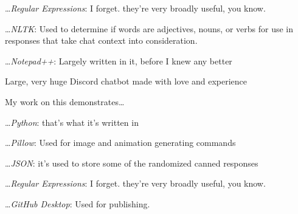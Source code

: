 \documentclass[10mm,letterpaper,notitlepage]{article}
\begin{document}
							\ldots\textit{Regular Expressions}: I forget. they're very broadly useful, you know.
							
							\ldots\textit{NLTK}: Used to determine if words are adjectives, nouns, or verbs for use in responses that take chat context into consideration.
							
							\ldots\textit{Notepad++}: Largely written in it, before I knew any better
							
						\setlength{\parindent}{\parindent-4mm}
							\fontsize{4.5mm}{6.0mm}\selectfont
							\color[RGB]{153, 141, 163}
						\color[RGB]{153, 141, 163}{R}\color[RGB]{153, 141, 163}{S}\color[RGB]{153, 141, 163}{R}\color[RGB]{153, 141, 163}{B}\color[RGB]{153, 141, 163}{ }\color[RGB]{153, 141, 163}{R}\color[RGB]{153, 141, 163}{e}\color[RGB]{153, 141, 163}{w}\color[RGB]{153, 141, 163}{r}\color[RGB]{153, 141, 163}{i}\color[RGB]{153, 141, 163}{t}\color[RGB]{153, 141, 163}{e}
						\fontsize{2.6999999999999997mm}{3.5999999999999996mm}\selectfont
						\color[RGB]{0, 0, 0}
					Large, very huge Discord chatbot made with love and experience
					
					My work on this demonstrates\ldots
						\setlength{\parindent}{\parindent+4mm}
						
						
								\fontsize{2.6999999999999997mm}{3.5999999999999996mm}\selectfont
								\color[RGB]{0, 0, 0}
							\ldots\textit{Python}: that's what it's written in
							
							\ldots\textit{Pillow}: Used for image and animation generating commands
							
							\ldots\textit{JSON}: it's used to store some of the randomized canned responses
							
							\ldots\textit{Regular Expressions}: I forget. they're very broadly useful, you know.
							
							\ldots\textit{GitHub Desktop}: Used for publishing.
							
						\setlength{\parindent}{\parindent-4mm}
				\setlength{\parindent}{\parindent-4mm}
			\setlength{\parindent}{\parindent-4mm}
			\setlength{\parindent}{\parindent+4mm}
			
\end{document}
